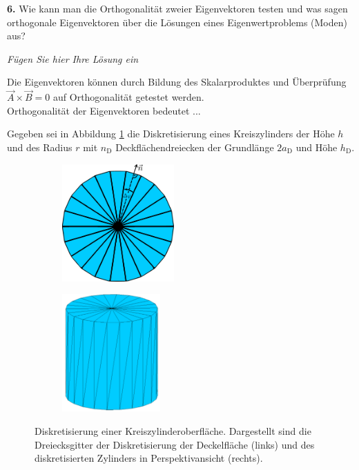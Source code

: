 \documentclass[Protokollheft.tex]{subfiles}
\begin{document}
    \begin{framed}
	\noindent \textbf{6.} Wie kann man die Orthogonalität zweier Eigenvektoren testen und was sagen orthogonale Eigenvektoren über die Lösungen eines Eigenwertproblems (Moden) aus?\label{exer:orthogonalEV}
\end{framed}

\emph{Fügen Sie hier Ihre Lösung ein}

Die Eigenvektoren können durch Bildung des Skalarproduktes und Überprüfung $\vec{A} \times \vec{B} = 0$ auf Orthogonalität getestet werden. \\
Orthogonalität der Eigenvektoren bedeutet ... 


    \noindent Gegeben sei in Abbildung \ref{fig:zylGitter} die Diskretisierung eines Kreiszylinders der Höhe $h$ und des Radius $r$ mit $n_\mathrm{D}$ Deckflächendreiecken der Grundlänge $2a_\text{D}$ und Höhe $h_\text{D}$.\\
	\begin{figure}[h]
		\centering
		\begin{subfigure}{0.49\textwidth}
			\centering
			\includegraphics[height=4.5cm]{v1_zylinder1.pdf}
		\end{subfigure}
		\begin{subfigure}{0.49\textwidth}
			\centering
			\includegraphics[height=4.5cm]{v1_zylinder2.pdf}
		\end{subfigure}
		\caption{Diskretisierung einer Kreiszylinderoberfläche. Dargestellt sind die Dreiecksgitter der Diskretisierung der Deckelfläche (links) und des diskretisierten Zylinders in Perspektivansicht (rechts).}\label{fig:zylGitter}
	\end{figure}
\end{document}
